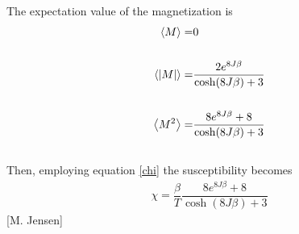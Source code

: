 \documentclass[%
reprint,nofootinbib,
amsmath,amssymb,
aps,
]{revtex4-1}
\begin{document}
The expectation value of the magnetization is
\vspace{1mm} \\ 
\begin{align} \label{exM}
	\expval{M} =&  0 \\ &\nonumber\\
\expval{\abs{M}} =&  \dfrac{2e^{8J\beta}}{\cosh(8J\beta) + 3 }\\ &\nonumber\\
\expval{M^2} =& \dfrac{8e^{8J\beta} + 8}{\cosh(8J\beta) + 3}
\end{align} \vspace{2mm}\\ 
Then, employing equation \ref{chi} the susceptibility becomes \vspace{1mm} \\ 
\begin{align}\label{CHI}
	\chi = \dfrac{\beta}{T}\dfrac{8e^{8J\beta} + 8}{\cosh(8J\beta) + 3}
\end{align}
\hspace{6.9cm}[M. Jensen]
\end{document}
